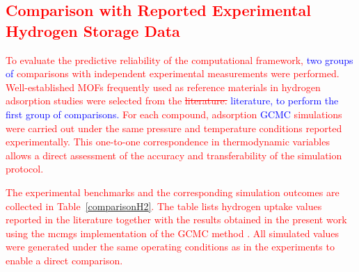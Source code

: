 \documentclass[review]{elsarticle}
\begin{document}
\subsection{\textcolor{red}{Comparison with Reported Experimental Hydrogen 
Storage Data}}

\textcolor{red}{To evaluate the predictive reliability of the computational 
framework, \textcolor{blue}{two groups of} comparisons with independent 
experimental measurements were performed. Well-established MOFs frequently used 
as reference materials in hydrogen adsorption studies were selected from the 
\sout{literature.} \textcolor{blue}{literature, to perform the first group of 
comparisons.} For each compound, adsorption \textcolor{blue}{GCMC} simulations 
were carried out under the same pressure and temperature conditions reported 
experimentally. This one-to-one correspondence in thermodynamic variables 
allows a direct assessment of the accuracy and transferability of the 
simulation protocol.}

\textcolor{red}{The experimental benchmarks and the corresponding simulation 
outcomes are collected in Table~\ref{comparisonH2}. The table lists hydrogen 
uptake values reported in the literature together with the results obtained in 
the present work using the mcmgs implementation of the GCMC method 
\cite{mcmgs}. All simulated values were generated under the same operating 
conditions as in the experiments to enable a direct comparison.
}
\end{document}
